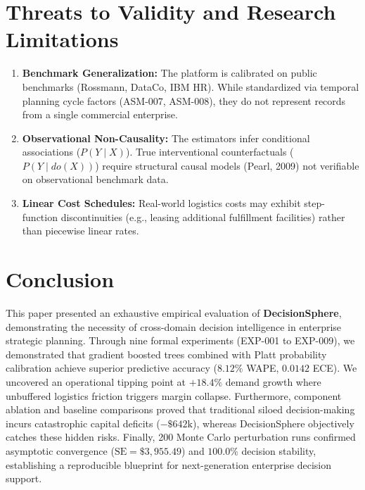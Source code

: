 \documentclass[10pt,conference]{IEEEtran}
\begin{document}
\section{Threats to Validity and Research Limitations}

\begin{enumerate}
    \item \textbf{Benchmark Generalization:} The platform is calibrated on public benchmarks (Rossmann, DataCo, IBM HR). While standardized via temporal planning cycle factors (ASM-007, ASM-008), they do not represent records from a single commercial enterprise.
    \item \textbf{Observational Non-Causality:} The estimators infer conditional associations ($P(Y \mid X)$). True interventional counterfactuals ($P(Y \mid do(X))$) require structural causal models (Pearl, 2009) not verifiable on observational benchmark data.
    \item \textbf{Linear Cost Schedules:} Real-world logistics costs may exhibit step-function discontinuities (e.g., leasing additional fulfillment facilities) rather than piecewise linear rates.
\end{enumerate}

\section{Conclusion}

This paper presented an exhaustive empirical evaluation of \textbf{DecisionSphere}, demonstrating the necessity of cross-domain decision intelligence in enterprise strategic planning. Through nine formal experiments (EXP-001 to EXP-009), we demonstrated that gradient boosted trees combined with Platt probability calibration achieve superior predictive accuracy ($8.12\%$ WAPE, $0.0142$ ECE). We uncovered an operational tipping point at $+18.4\%$ demand growth where unbuffered logistics friction triggers margin collapse. Furthermore, component ablation and baseline comparisons proved that traditional siloed decision-making incurs catastrophic capital deficits ($-\$642\text{k}$), whereas DecisionSphere objectively catches these hidden risks. Finally, 200 Monte Carlo perturbation runs confirmed asymptotic convergence ($\text{SE} = \$3,955.49$) and $100.0\%$ decision stability, establishing a reproducible blueprint for next-generation enterprise decision support.



\end{document}
